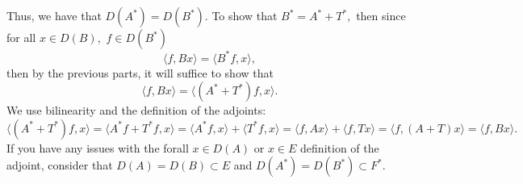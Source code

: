 \documentclass[11pt]{article}
\begin{document}
\begin{problem}
\begin{enumerate}
\begin{solution}
Thus, we have that $D(A^*) = D(B^*).$ To show that $B^* = A^* + T^*,$ then since for all $x\in D(B),$ $f\in D(B^*)$
\[\langle f, Bx\rangle = \langle B^*f, x\rangle,\] then by the previous parts, it will suffice to show that 
\[\langle f, Bx\rangle = \langle (A^* + T^*)f, x\rangle.\] We use bilinearity and the definition of the adjoints:
\[\langle (A^* + T^*)f, x\rangle = \langle A^*f +T^*f, x\rangle = \langle A^*f, x\rangle + \langle T^*f, x\rangle = \langle f, Ax\rangle + \langle f, Tx \rangle = \langle f, (A + T)x\rangle = \langle f, Bx\rangle.\] If you have any issues with the forall $x\in D(A)$ or $x\in E$ definition of the adjoint, consider that $D(A) = D(B)\subset E$ and $D(A^*)= D(B^*)\subset F^*.$   
\end{solution}
\end{enumerate}
\end{problem}

\newpage
\end{document}

